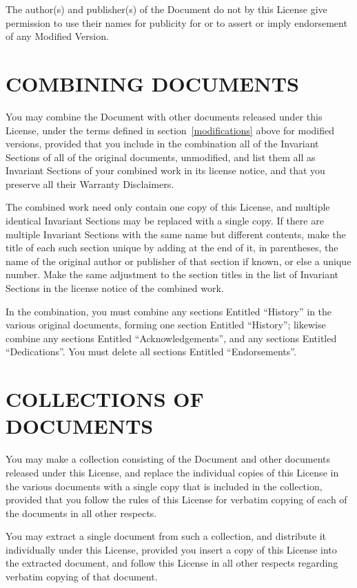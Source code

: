 \documentclass[10pt,a4paper,titlepage,twoside,openright]{report}
\begin{document}
The author(s) and publisher(s) of the Document do not by this License
give permission to use their names for publicity for or to assert or
imply endorsement of any Modified Version.


\section*{COMBINING DOCUMENTS}
\label{combining}

You may combine the Document with other documents released under this
License, under the terms defined in section~\ref{modifications}
above for modified
versions, provided that you include in the combination all of the
Invariant Sections of all of the original documents, unmodified, and
list them all as Invariant Sections of your combined work in its
license notice, and that you preserve all their Warranty Disclaimers.

The combined work need only contain one copy of this License, and
multiple identical Invariant Sections may be replaced with a single
copy.  If there are multiple Invariant Sections with the same name but
different contents, make the title of each such section unique by
adding at the end of it, in parentheses, the name of the original
author or publisher of that section if known, or else a unique number.
Make the same adjustment to the section titles in the list of
Invariant Sections in the license notice of the combined work.

In the combination, you must combine any sections Entitled ``History''
in the various original documents, forming one section Entitled
``History''; likewise combine any sections Entitled ``Acknowledgements'',
and any sections Entitled ``Dedications''.  You must delete all sections
Entitled ``Endorsements''.


\section*{COLLECTIONS OF DOCUMENTS}
\label{collections}

You may make a collection consisting of the Document and other documents
released under this License, and replace the individual copies of this
License in the various documents with a single copy that is included in
the collection, provided that you follow the rules of this License for
verbatim copying of each of the documents in all other respects.

You may extract a single document from such a collection, and distribute
it individually under this License, provided you insert a copy of this
License into the extracted document, and follow this License in all
other respects regarding verbatim copying of that document.
\end{document}
